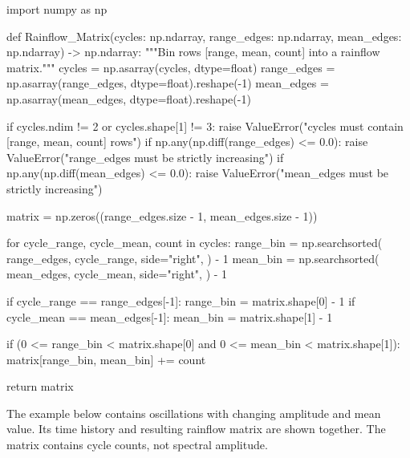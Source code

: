 \begin{python}
import numpy as np


def Rainflow_Matrix(cycles: np.ndarray,
                    range_edges: np.ndarray,
                    mean_edges: np.ndarray) -> np.ndarray:
    """Bin rows [range, mean, count] into a rainflow matrix."""
    cycles = np.asarray(cycles, dtype=float)
    range_edges = np.asarray(range_edges, dtype=float).reshape(-1)
    mean_edges = np.asarray(mean_edges, dtype=float).reshape(-1)

    if cycles.ndim != 2 or cycles.shape[1] != 3:
        raise ValueError("cycles must contain [range, mean, count] rows")
    if np.any(np.diff(range_edges) <= 0.0):
        raise ValueError("range_edges must be strictly increasing")
    if np.any(np.diff(mean_edges) <= 0.0):
        raise ValueError("mean_edges must be strictly increasing")

    matrix = np.zeros((range_edges.size - 1, mean_edges.size - 1))

    for cycle_range, cycle_mean, count in cycles:
        range_bin = np.searchsorted(
            range_edges,
            cycle_range,
            side="right",
        ) - 1
        mean_bin = np.searchsorted(
            mean_edges,
            cycle_mean,
            side="right",
        ) - 1

        if cycle_range == range_edges[-1]:
            range_bin = matrix.shape[0] - 1
        if cycle_mean == mean_edges[-1]:
            mean_bin = matrix.shape[1] - 1

        if (0 <= range_bin < matrix.shape[0]
                and 0 <= mean_bin < matrix.shape[1]):
            matrix[range_bin, mean_bin] += count

    return matrix
\end{python}

The example below contains oscillations with changing amplitude and mean value.
Its time history and resulting rainflow matrix are shown together. The matrix
contains cycle counts, not spectral amplitude.


